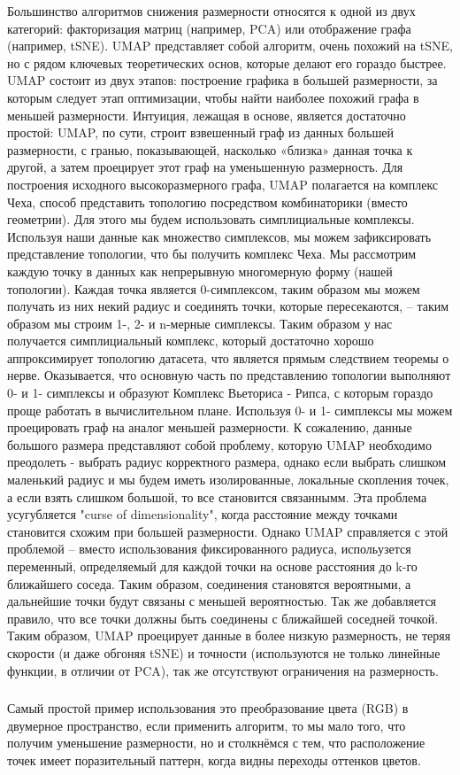Большинство алгоритмов снижения размерности относятся к одной из двух категорий: факторизация матриц (например, PCA) или отображение графа (например, tSNE).  UMAP представляет собой алгоритм, очень похожий на tSNE, но с рядом ключевых теоретических основ, которые делают его гораздо быстрее. UMAP состоит из двух этапов: построение графика в большей размерности, за которым следует этап оптимизации, чтобы найти наиболее похожий графа в меньшей размерности. Интуиция, лежащая в основе, является достаточно простой: UMAP, по сути, строит взвешенный граф из данных большей размерности, с гранью, показывающей, насколько «близка» данная точка к другой, а затем проецирует этот граф на уменьшенную размерность. Для построения исходного высокоразмерного графа, UMAP полагается на комплекс Чеха, способ представить топологию посредством комбинаторики (вместо геометрии). Для этого мы будем использовать симплициальные комплексы. Используя наши данные как множество симплексов, мы можем зафиксировать представление топологии, что бы получить комплекс Чеха. Мы рассмотрим каждую точку в данных как непрерывную многомерную форму (нашей топологии). Каждая точка является 0-симплексом, таким образом мы можем получать из них некий радиус и соединять точки, которые пересекаются, -- таким образом мы строим 1-, 2- и n-мерные симплексы. Таким образом у нас получается симплициальный комплекс, который достаточно хорошо аппроксимирует топологию датасета, что является прямым следствием теоремы о нерве. Оказывается, что основную часть по представлению топологии выполняют 0- и 1- симплексы и образуют Комплекс Вьеториса - Рипса, с которым гораздо проще работать в вычислительном плане. Используя 0- и 1- симплексы мы можем проецировать граф на аналог меньшей размерности.
К сожалению, данные большого размера представляют собой проблему, которую UMAP необходимо преодолеть - выбрать радиус корректного размера, однако если выбрать слишком маленький радиус и мы будем иметь изолированные, локальные скопления точек, а если взять слишком большой, то все становится связаннымм. Эта проблема усугубляется "curse of dimensionality", когда расстояние между точками становится схожим при большей размерности. Однако UMAP справляется с этой проблемой -- вместо использования фиксированного радиуса, испольузется переменный, определяемый для каждой точки на основе расстояния до k-го ближайшего соседа. Таким образом, соединения становятся вероятными, а дальнейшие точки будут связаны с меньшей вероятностью. Так же добавляется правило, что все точки должны быть соединены с ближайшей соседней точкой. Таким образом, UMAP проецирует данные в более низкую размерность, не теряя скорости (и даже обгоняя tSNE) и точности (используются не только линейные функции, в отличии от PCA), так же отсутствуют ограничения на размерность.

\renewcommand{\thesubsubsection}{Пример}
\subsubsection{}
Самый простой пример использования это преобразование цвета (RGB) в двумерное пространство, если применить алгоритм, то мы мало того, что получим уменьшение размерности, но и столкнёмся с тем, что расположение точек имеет поразительный паттерн, когда видны переходы оттенков цветов.

